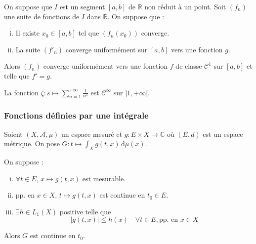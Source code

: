 	\begin{proposition}
		On suppose que $I$ est un segment $[a,b]$ de $\mathbb{R}$ non réduit à un point. Soit $(f_n)$ une suite de fonctions de $I$ dans $\mathbb{R}$. On suppose que :
		\begin{enumerate}[(i)]
			\item Il existe $x_0 \in [a,b]$ tel que $(f_n(x_0))$ converge.
			\item La suite $(f'_n)$ converge uniformément sur $[a,b]$ vers une fonction $g$.
		\end{enumerate}
		Alors $(f_n)$ converge uniformément vers une fonction $f$ de classe $\mathcal{C}^1$ sur $[a,b]$ et telle que $f'=g$.
	\end{proposition}
	
	
	\begin{example}
		La fonction $\zeta : s \mapsto \sum_{n=1}^{+\infty} \frac{1}{n^s}$ est $\mathcal{C}^\infty$ sur $]1,+\infty[$.
	\end{example}
	
	\subsubsection{Fonctions définies par une intégrale}
	
	
	Soient $(X, \mathcal{A}, \mu)$ un espace mesuré et $g : E \times X \rightarrow \mathbb{C}$ où $(E, d)$ est un espace métrique. On pose $G : t \mapsto \int_X g(t, x) \, \mathrm{d}\mu(x)$.
	
	\begin{theorem}
		On suppose :
		\begin{enumerate}[(i)]
			\item $\forall t \in E$, $x \mapsto g(t,x)$ est mesurable.
			\item pp. en $x \in X$, $t \mapsto g(t,x)$ est continue en $t_0 \in E$.
			\item $\exists h \in L_1(X)$ positive telle que
			\[ |g(t,x)| \leq h(x) \quad \forall t \in E, \text{pp. en } x \in X \]
		\end{enumerate}
		Alors $G$ est continue en $t_0$.
	\end{theorem}
	

